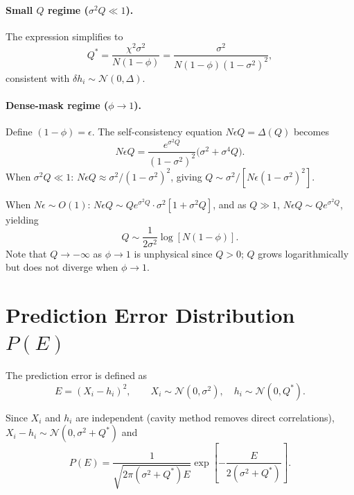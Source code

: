 \documentclass[aps,prb,onecolumn,showpacs,preprintnumbers,amsmath,amssymb]{revtex4-2}
\begin{document}
\paragraph{Small $Q$ regime ($\sigma^2 Q \ll 1$).}
The expression simplifies to
\begin{equation}
    Q^* = \frac{\chi^2 \sigma^2}{N(1-\phi)}
               = \frac{\sigma^2}{N(1-\phi)(1-\sigma^2)^2},
\end{equation}
consistent with $\delta h_i \sim \mathcal{N}(0,\Delta)$.

\paragraph{Dense-mask regime ($\phi \to 1$).}
Define $(1-\phi)=\epsilon$. The self-consistency equation $N\epsilon Q = \Delta(Q)$
becomes
\begin{equation}
    N\epsilon Q = \frac{e^{\sigma^2 Q}}{(1-\sigma^2)^2}\bigl(\sigma^2 + \sigma^4 Q\bigr).
\end{equation}
When $\sigma^2 Q \ll 1$: $N\epsilon Q \approx \sigma^2/(1-\sigma^2)^2$, giving
$Q \sim \sigma^2/[N\epsilon(1-\sigma^2)^2]$.

When $N\epsilon \sim O(1)$: $N\epsilon Q \sim Q e^{\sigma^2 Q}\cdot\sigma^2[1+\sigma^2 Q]$,
and as $Q \gg 1$, $N\epsilon Q \sim Qe^{\sigma^2 Q}$, yielding
\begin{equation}
    Q \sim \frac{1}{2\sigma^2}\log[N(1-\phi)].
\end{equation}
Note that $Q \to -\infty$ as $\phi\to 1$ is unphysical since $Q>0$; $Q$ grows
logarithmically but does not diverge when $\phi\to 1$.

\section{Prediction Error Distribution \texorpdfstring{$P(E)$}{P(E)}}

The prediction error is defined as
\begin{equation}
    E = (X_i - h_i)^2,
    \qquad X_i \sim \mathcal{N}(0,\sigma^2),\quad h_i \sim \mathcal{N}(0,Q^*).
\end{equation}

Since $X_i$ and $h_i$ are independent (cavity method removes direct correlations),
$X_i - h_i \sim \mathcal{N}(0,\sigma^2+Q^*)$ and
\begin{equation}
    P(E) = \frac{1}{\sqrt{2\pi(\sigma^2+Q^*)E}}
                  \exp\!\left[-\frac{E}{2(\sigma^2+Q^*)}\right].
\end{equation}
\end{document}
